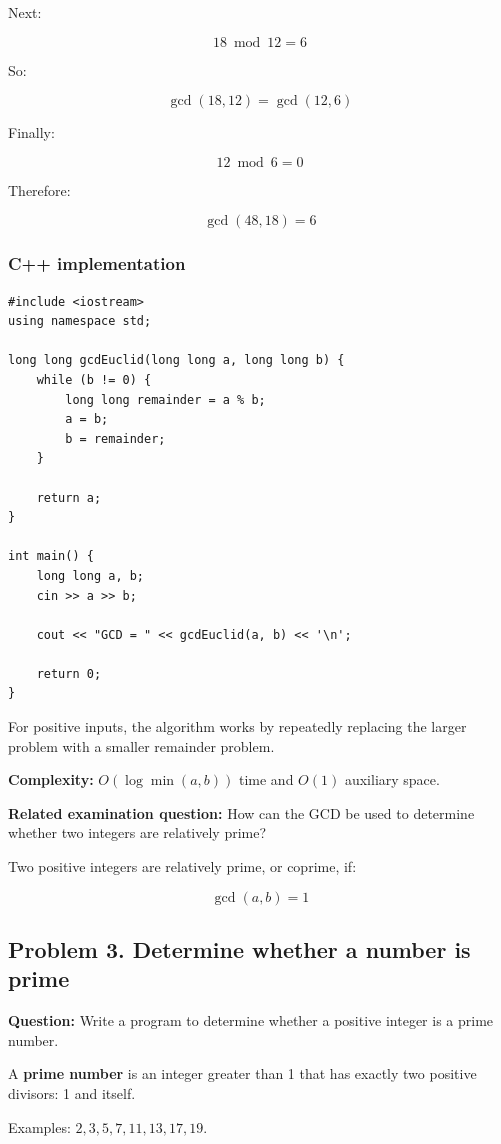 Next:


\[
18\bmod12=6
\]


So:


\[
\gcd(18,12)=\gcd(12,6)
\]


Finally:


\[
12\bmod6=0
\]


Therefore:


\[
\boxed{\gcd(48,18)=6}
\]


\subsubsection{C++ implementation}

\begin{lstlisting}[style=cppstyle]
#include <iostream>
using namespace std;

long long gcdEuclid(long long a, long long b) {
    while (b != 0) {
        long long remainder = a % b;
        a = b;
        b = remainder;
    }

    return a;
}

int main() {
    long long a, b;
    cin >> a >> b;

    cout << "GCD = " << gcdEuclid(a, b) << '\n';

    return 0;
}
\end{lstlisting}

For positive inputs, the algorithm works by repeatedly replacing the larger problem with a smaller remainder problem.

\textbf{Complexity:} $O(\log\min(a,b))$ time and $O(1)$ auxiliary space.

\textbf{Related examination question:} How can the GCD be used to determine whether two integers are relatively prime?

Two positive integers are relatively prime, or coprime, if:


\[
\boxed{\gcd(a,b)=1}
\]


\subsection{Problem 3. Determine whether a number is prime}

\textbf{Question:} Write a program to determine whether a positive integer is a prime number.

A \textbf{prime number} is an integer greater than 1 that has exactly two positive divisors: 1 and itself.

Examples: $2,3,5,7,11,13,17,19$.

